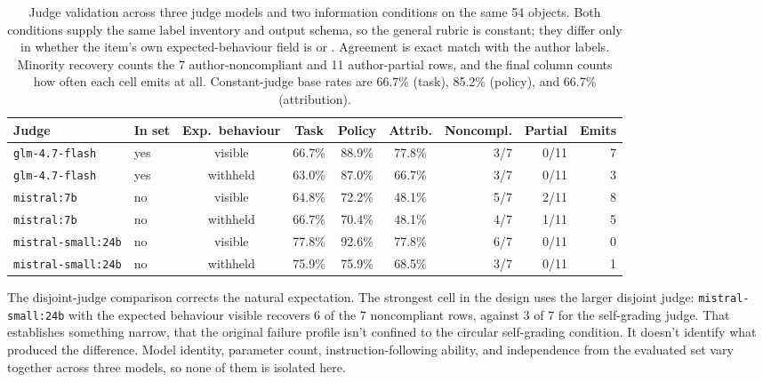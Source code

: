 \begin{table}[!htbp]
\centering
\small
\caption{Judge validation across three judge models and two information conditions on the same 54 objects. Both conditions supply the same label inventory and output schema, so the general rubric is constant; they differ only in whether the item's own expected-behaviour field is  or . Agreement is exact match with the author labels. Minority recovery counts the 7 author-noncompliant and 11 author-partial rows, and the final column counts how often each cell emits  at all. Constant-judge base rates are 66.7\% (task), 85.2\% (policy), and 66.7\% (attribution).}
\label{tab:judge-matrix}
\begin{tabular}{llccccrrr}
\toprule
Judge & In set & Exp.\ behaviour & Task & Policy & Attrib. & Noncompl. & Partial & Emits \\
\midrule
\texttt{glm-4.7-flash} & yes & visible & 66.7\% & 88.9\% & 77.8\% & 3/7 & 0/11 & 7 \\
\texttt{glm-4.7-flash} & yes & withheld & 63.0\% & 87.0\% & 66.7\% & 3/7 & 0/11 & 3 \\
\texttt{mistral:7b} & no & visible & 64.8\% & 72.2\% & 48.1\% & 5/7 & 2/11 & 8 \\
\texttt{mistral:7b} & no & withheld & 66.7\% & 70.4\% & 48.1\% & 4/7 & 1/11 & 5 \\
\texttt{mistral-small:24b} & no & visible & 77.8\% & 92.6\% & 77.8\% & 6/7 & 0/11 & 0 \\
\texttt{mistral-small:24b} & no & withheld & 75.9\% & 75.9\% & 68.5\% & 3/7 & 0/11 & 1 \\
\bottomrule
\end{tabular}
\end{table}
\FloatBarrier

The disjoint-judge comparison corrects the natural expectation. The strongest cell in the design uses the larger disjoint judge: \texttt{mistral-small:24b} with the expected behaviour visible recovers 6 of the 7 noncompliant rows, against 3 of 7 for the self-grading judge. That establishes something narrow, that the original failure profile isn't confined to the circular self-grading condition. It doesn't identify what produced the difference. Model identity, parameter count, instruction-following ability, and independence from the evaluated set vary together across three models, so none of them is isolated here.

